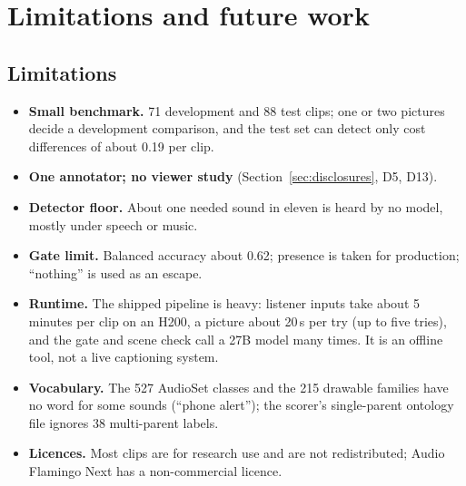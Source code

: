 \section{Limitations and future work}\label{sec:limits}

\subsection{Limitations}
\begin{itemize}
  \item \textbf{Small benchmark.} 71 development and 88 test clips; one or two pictures decide a development
        comparison, and the test set can detect only cost differences of about 0.19 per clip.
  \item \textbf{One annotator; no viewer study} (Section~\ref{sec:disclosures}, D5, D13).
  \item \textbf{Detector floor.} About one needed sound in eleven is heard by no model, mostly under speech or music.
  \item \textbf{Gate limit.} Balanced accuracy about 0.62; presence is taken for production; ``nothing'' is used as an
        escape.
  \item \textbf{Runtime.} The shipped pipeline is heavy: listener inputs take about 5 minutes per clip on an H200,
        a picture about 20\,s per try (up to five tries), and the gate and scene check call a 27B model many times.
        It is an offline tool, not a live captioning system.
  \item \textbf{Vocabulary.} The 527 AudioSet classes and the 215 drawable families have no word for some sounds
        (``phone alert''); the scorer's single-parent ontology file ignores 38 multi-parent labels.
  \item \textbf{Licences.} Most clips are for research use and are not redistributed; Audio Flamingo Next has a
        non-commercial licence.
\end{itemize}

